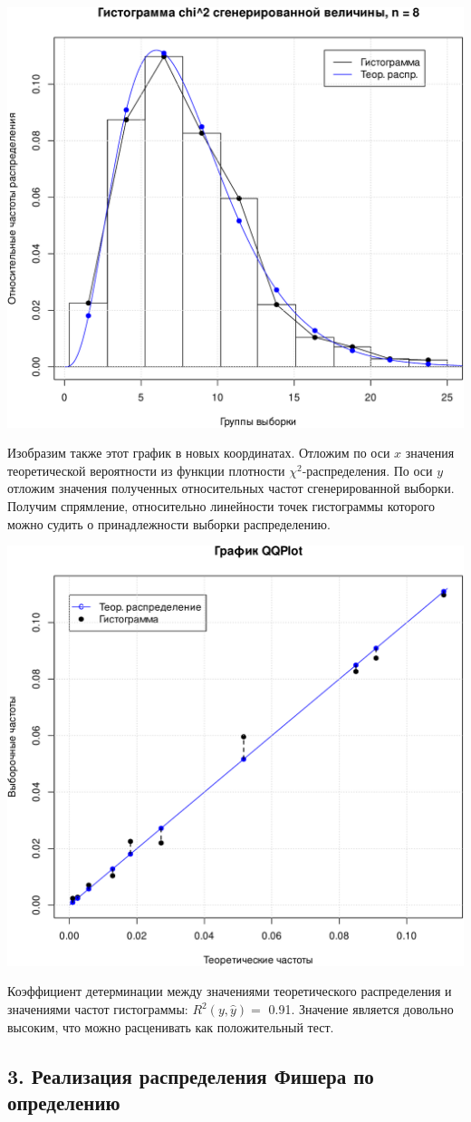 \documentclass[
]{article}
\begin{document}
\begin{center}\includegraphics[width=0.6\linewidth]{Prac4_files/figure-latex/unnamed-chunk-5-1} \end{center}

Изобразим также этот график в новых координатах. Отложим по оси \(x\)
значения теоретической вероятности из функции плотности
\(\chi^2\)-распределения. По оси \(y\) отложим значения полученных
относительных частот сгенерированной выборки. Получим спрямление,
относительно линейности точек гистограммы которого можно судить о
принадлежности выборки распределению.

\begin{center}\includegraphics[width=0.6\linewidth]{Prac4_files/figure-latex/unnamed-chunk-6-1} \end{center}

Коэффициент детерминации между значениями теоретического распределения и
значениями частот гистограммы: \(R^2(y, \hat{y}) =\) 0.91. Значение
является довольно высоким, что можно расценивать как положительный тест.

\hypertarget{ux440ux435ux430ux43bux438ux437ux430ux446ux438ux44f-ux440ux430ux441ux43fux440ux435ux434ux435ux43bux435ux43dux438ux44f-ux444ux438ux448ux435ux440ux430-ux43fux43e-ux43eux43fux440ux435ux434ux435ux43bux435ux43dux438ux44e}{%
\subsection{\texorpdfstring{\textbf{3. Реализация распределения Фишера
по
определению}}{3. Реализация распределения Фишера по определению}}\label{ux440ux435ux430ux43bux438ux437ux430ux446ux438ux44f-ux440ux430ux441ux43fux440ux435ux434ux435ux43bux435ux43dux438ux44f-ux444ux438ux448ux435ux440ux430-ux43fux43e-ux43eux43fux440ux435ux434ux435ux43bux435ux43dux438ux44e}}
\end{document}
